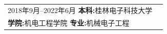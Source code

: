 


\begin{tabular}{ll}	
	\textsc{2018年9月--2022年6月}	\qquad	\textbf{本科:}桂林电子科技大学\\ 

	\textbf{学院:}机电工程学院 \qquad \qquad	\textbf{专业:}机械电子工程 \\ 

\end{tabular}
\\ 
